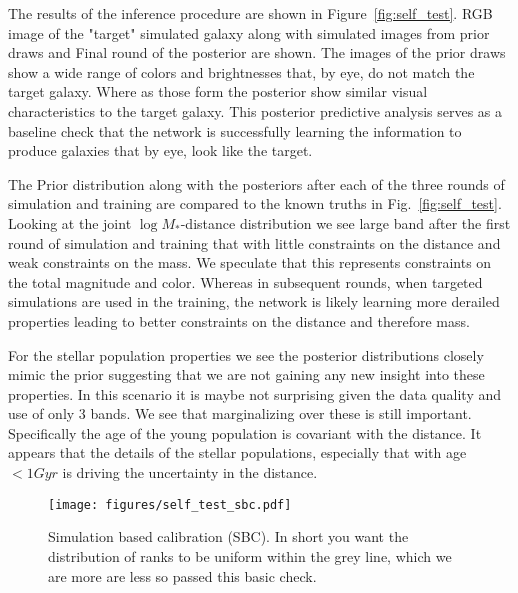 \documentclass[twocolumn]{aastex631}
\begin{document}
The results of the inference procedure are shown in Figure~\ref{fig:self_test}. RGB image of the "target" simulated galaxy along with simulated images from prior draws and Final round of the posterior are shown. The images of the prior draws show a wide range of colors and  brightnesses that, by eye, do not match the  target galaxy. Where as those form the posterior show similar visual characteristics to the target galaxy. This posterior predictive analysis serves as a baseline check that the network is successfully learning the information to produce galaxies that by eye, look like the target.

The Prior distribution along with the posteriors after each of the three rounds of simulation and training are compared to the known truths in Fig.~\ref{fig:self_test}. Looking at the joint $\log M_*$-distance distribution we see large band after the first round of simulation and training that with little constraints on the distance and weak constraints on the mass. We speculate that this represents constraints on the total magnitude and color. Whereas in subsequent rounds, when targeted simulations are used in the training, the network is likely learning more derailed properties leading to better constraints on the distance and therefore mass.

For the stellar population properties we see the posterior distributions closely mimic the prior suggesting that we are not gaining any new insight into these properties. In this scenario it is maybe not surprising given the data quality and use of only 3 bands. We see that marginalizing over these is still important. Specifically the age of the young population is covariant with the distance. It appears that the details of the stellar populations, especially that with age $< 1Gyr$ is driving the uncertainty in the distance.

\begin{figure}
    \centering
    \texttt{[image: figures/self\_test\_sbc.pdf]}
    \caption{Simulation based calibration (SBC). In short you want the distribution of ranks to be uniform within the grey line, which we are more are less so passed this basic check.}
    \label{fig:self_test_sbc}
\end{figure}
\end{document}
